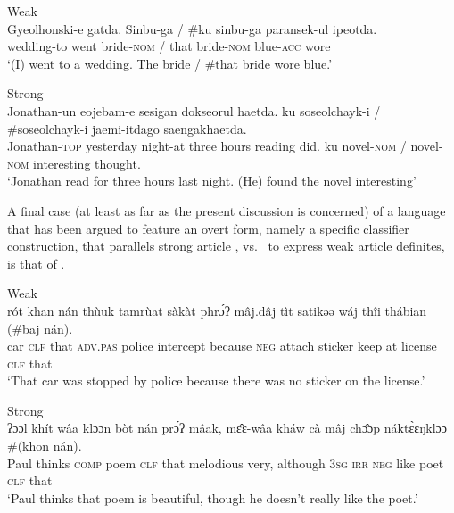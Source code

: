 \documentclass[output=paper
,modfonts
,nonflat]{langscibook}
\begin{document}
\begin{exe}
\ex\label{ex:schwarz:18} 
\begin{xlist}
\ex Weak\\ \gll Gyeolhonski-e gatda. {Sinbu-ga} \textnormal{/} \textnormal{\#}ku {sinbu-ga} paransek-ul
ipeotda.\\
 wedding-to went bride-\textsc{nom} / {\phantom{\#}}that bride-\textsc{nom} blue-\textsc{acc} wore \\
\glt `(I) went to a wedding. The bride / \#that bride wore blue.'

\ex Strong\\ \gll Jonathan-un eojebam-e sesigan dokseorul haetda. {ku}
{soseolchayk-i} \textnormal{/} \textnormal{\#}soseolchayk-i jaemi-itdago saengakhaetda.\\
Jonathan-\textsc{top} yesterday night-at {three hours} {reading did}. ku novel-\textsc{nom} / \phantom{\#}novel-\textsc{nom} interesting thought.\\
\glt `Jonathan read for three hours last night. (He) found the novel
interesting' 
\end{xlist}
\end{exe}



A final case (at least as far as the present discussion is concerned) of
a language that has been argued to feature an overt form, namely a specific classifier
construction, that parallels strong article , vs.\ 
to express weak article definites, is that of .

\begin{exe}
\ex\label{ex:schwarz:19}  
\begin{xlist}
\ex Weak\\ \gll r\'ot khan n\'an th\`uuk tamr\`uat s\`ak\`at
{phr\'ɔʔ} m\^aj.d\^aj t\`it
{satikəə} w\'aj th\^ii {th\'abian} ({\#baj} {n\'an}).\\
 car \textsc{clf} that \textsc{adv.pas} police intercept because \textsc{neg} attach sticker 
keep at license {\phantom{(\#}}\textsc{clf} that\\
\glt `That car was stopped by police because there was no sticker on
the license.'

 \ex Strong\\\gll ʔɔɔl kh\'it w\^aa
klɔɔn b\`ot n\'an {pr\'ɔʔ} m\^aak, m\^ɛɛ-w\^aa kh\'aw c\`a m\^aj
 ch\^ɔɔp {n\'akt\`ɛɛŋklɔɔ}  \#({khon} {n\'an}).\\
 Paul thinks \textsc{comp} poem \textsc{clf} that melodious very, although 3\textsc{sg} \textsc{irr} \textsc{neg} like poet {\phantom{\#(}}\textsc{clf} that\\
\glt`Paul thinks that poem is beautiful, though he doesn't really like the
poet.' 
\end{xlist}
\end{exe}
\end{document}
